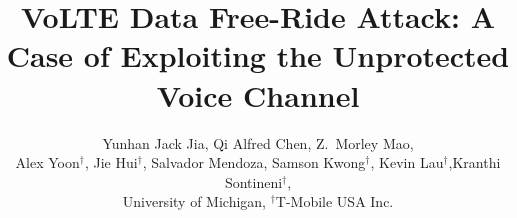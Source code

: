 \documentclass{sig-alternate-10pt}[10]
\begin{document}
\title{VoLTE Data Free-Ride Attack: A Case of Exploiting the Unprotected Voice Channel}
\author{
Yunhan Jack Jia, Qi Alfred Chen, Z.~Morley Mao,\\
Alex Yoon$^\dagger$, Jie Hui$^\dagger$, Salvador Mendoza, Samson Kwong$^\dagger$, Kevin Lau$^\dagger$,Kranthi Sontineni$^\dagger$,
\\
University of Michigan, $^\dagger$T-Mobile USA Inc.
\\
} 
\iffalse
\numberofauthors{2}
\author{
\small{
    \alignauthor Yunhan Jack Jia, Qi Alfred Chen, and Z.~Morley Mao \\
    \affaddr{University of Michigan} \\
    \alignauthor Alex Yoon, Jie Hui, Salvador Mendoza, Samson Kwong, Kevin Lau, Kranthi, Sontinei \\
    \affaddr{T-Mobile USA Inc.$^1$}\\
}}
\fi
\iffalse
{}
\end{document}
